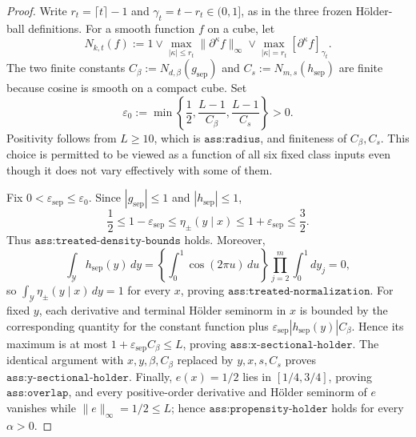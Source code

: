 \documentclass{article}
\begin{document}
\begin{proof}
Write \(r_t=\lceil t\rceil-1\) and \(\gamma_t=t-r_t\in(0,1]\), as in the three frozen H\"older-ball definitions.  For a smooth function \(f\) on a cube, let
\[
N_{k,t}(f):=1\vee\max_{|\kappa|\le r_t}\|\partial^\kappa f\|_\infty
 \vee\max_{|\kappa|=r_t}[\partial^\kappa f]_{\gamma_t}.
\]
The two finite constants \(C_\beta:=N_{d,\beta}(g_{\mathrm{sep}})\) and \(C_s:=N_{m,s}(h_{\mathrm{sep}})\) are finite because cosine is smooth on a compact cube.  Set
\[
\varepsilon_0:=\min\left\{\frac12,\frac{L-1}{C_\beta},\frac{L-1}{C_s}\right\}>0.
\]
Positivity follows from \(L\ge10\), which is \(\texttt{ass:radius}\), and finiteness of \(C_\beta,C_s\).  This choice is permitted to be viewed as a function of all six fixed class inputs even though it does not vary effectively with some of them.

Fix \(0<\varepsilon_{\mathrm{sep}}\le\varepsilon_0\).  Since \(|g_{\mathrm{sep}}|\le1\) and \(|h_{\mathrm{sep}}|\le1\),
\[
\frac12\le 1-\varepsilon_{\mathrm{sep}}
 \le \eta_\pm(y\mid x)
 \le 1+\varepsilon_{\mathrm{sep}}\le\frac32.
\]
Thus \(\texttt{ass:treated-density-bounds}\) holds.  Moreover,
\[
\int_{\mathcal Y}h_{\mathrm{sep}}(y)\,dy
=\left\{\int_0^1\cos(2\pi u)\,du\right\}
 \prod_{j=2}^m\int_0^1dy_j=0,
\]
so \(\int_{\mathcal Y}\eta_\pm(y\mid x)\,dy=1\) for every \(x\), proving \(\texttt{ass:treated-normalization}\).  For fixed \(y\), each derivative and terminal H\"older seminorm in \(x\) is bounded by the corresponding quantity for the constant function plus \(\varepsilon_{\mathrm{sep}}|h_{\mathrm{sep}}(y)|C_\beta\).  Hence its maximum is at most \(1+\varepsilon_{\mathrm{sep}}C_\beta\le L\), proving \(\texttt{ass:x-sectional-holder}\).  The identical argument with \(x,y,\beta,C_\beta\) replaced by \(y,x,s,C_s\) proves \(\texttt{ass:y-sectional-holder}\).  Finally, \(e(x)=1/2\) lies in \([1/4,3/4]\), proving \(\texttt{ass:overlap}\), and every positive-order derivative and H\"older seminorm of \(e\) vanishes while \(\|e\|_\infty=1/2\le L\); hence \(\texttt{ass:propensity-holder}\) holds for every \(\alpha>0\).


\end{proof}
\end{document}
